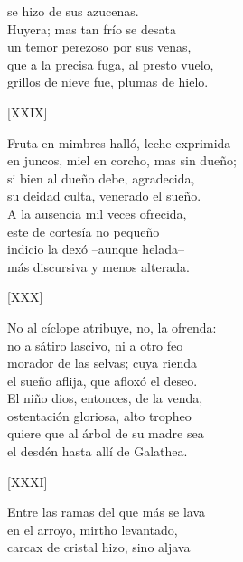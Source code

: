 \documentclass[11pt,a4paper,twoside]{article}
\begin{document}
 se hizo de sus azucenas.\\
Huyera; mas tan frío se desata\\
un temor perezoso por sus venas,\\
que a la precisa fuga, al presto vuelo,\\
grillos de nieve fue, plumas de hielo.\par\pend
%
\begin{center}
	[XXIX]
\end{center}\pstart
Fruta en mimbres halló, leche exprimida\\
en juncos, miel en corcho, mas sin dueño;\\
si bien al dueño debe, agradecida,\\
su deidad culta, venerado el sueño.\\
A la ausencia mil veces ofrecida,\\
este de cortesía no pequeño\\
indicio la dexó --aunque  helada--\\
más discursiva y menos alterada.\par\pend
%
\begin{center}
	[XXX]
\end{center}\pstart
No al cíclope atribuye, no, la ofrenda:\\
no a sátiro lascivo, ni a otro feo\\
morador de las selvas; cuya rienda\\
el sueño aflija, que afloxó el deseo.\\
El niño dios, entonces, de la venda,\\
ostentación gloriosa, alto tropheo\\
quiere que al árbol de su madre sea\\
el desdén hasta allí de Galathea.\par\pend
%
\begin{center}
	[XXXI]
\end{center}\pstart
Entre las ramas del que más se lava\\
en el arroyo, mirtho levantado,\\
carcax de cristal hizo, sino aljava\\
\end{document}
